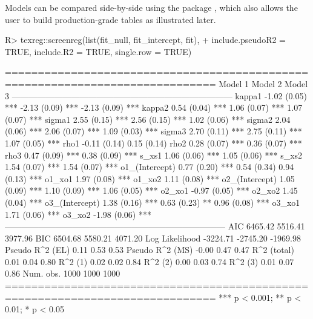 \documentclass[%
    twoside, openright, titlepage, numbers=noenddot,%
    cleardoublepage=empty,%
    abstract=false,%
    BCOR=5.5mm, paper=a5, fontsize=10pt,%
]{scrreprt}
\begin{document}
Models can be compared side-by-side using the  package \citep{Leifeld:2013}, which also allows the user to build production-grade tables as illustrated later.
%
\begin{Schunk}
\begin{Sinput}
R> texreg::screenreg(list(fit_null, fit_intercept, fit),
+    include.pseudoR2 = TRUE, include.R2 = TRUE, single.row = TRUE)
\end{Sinput}
\begin{Soutput}
==============================================================================
                 Model 1              Model 2              Model 3            
------------------------------------------------------------------------------
kappa1              -1.02 (0.05) ***     -2.13 (0.09) ***     -2.13 (0.09) ***
kappa2               0.54 (0.04) ***      1.06 (0.07) ***      1.07 (0.07) ***
sigma1               2.55 (0.15) ***      2.56 (0.15) ***      1.02 (0.06) ***
sigma2               2.04 (0.06) ***      2.06 (0.07) ***      1.09 (0.03) ***
sigma3               2.70 (0.11) ***      2.75 (0.11) ***      1.07 (0.05) ***
rho1                                     -0.11 (0.14)          0.15 (0.14)    
rho2                                      0.28 (0.07) ***      0.36 (0.07) ***
rho3                                      0.47 (0.09) ***      0.38 (0.09) ***
s_xs1                                     1.06 (0.06) ***      1.05 (0.06) ***
s_xs2                                     1.54 (0.07) ***      1.54 (0.07) ***
o1_(Intercept)       0.77 (0.20) ***      0.54 (0.34)          0.94 (0.13) ***
o1_xo1                                                         1.97 (0.08) ***
o1_xo2                                                         1.11 (0.08) ***
o2_(Intercept)       1.05 (0.09) ***      1.10 (0.09) ***      1.06 (0.05) ***
o2_xo1                                                        -0.97 (0.05) ***
o2_xo2                                                         1.45 (0.04) ***
o3_(Intercept)       1.38 (0.16) ***      0.63 (0.23) **       0.96 (0.08) ***
o3_xo1                                                         1.71 (0.06) ***
o3_xo2                                                        -1.98 (0.06) ***
------------------------------------------------------------------------------
AIC               6465.42              5516.41              3977.96           
BIC               6504.68              5580.21              4071.20           
Log Likelihood   -3224.71             -2745.20             -1969.98           
Pseudo R^2 (EL)      0.11                 0.53                 0.53           
Pseudo R^2 (MS)     -0.00                 0.47                 0.47           
R^2 (total)          0.01                 0.04                 0.80           
R^2 (1)              0.02                 0.02                 0.84           
R^2 (2)              0.00                 0.03                 0.74           
R^2 (3)              0.01                 0.07                 0.86           
Num. obs.         1000                 1000                 1000              
==============================================================================
*** p < 0.001; ** p < 0.01; * p < 0.05
\end{Soutput}
\end{Schunk}
\end{document}

